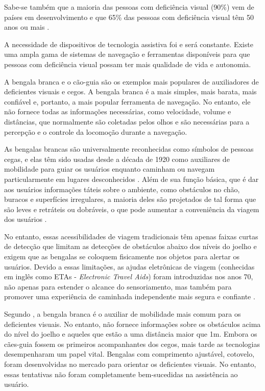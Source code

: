 Sabe-se também que a maioria das pessoas com deficiência visual (90\%) vem de países em desenvolvimento e que 65\% das pessoas com deficiência visual têm 50 anos ou mais \cite{Contreras2017}. 

A necessidade de dispositivos de tecnologia assistiva foi e será constante. Existe uma ampla gama de sistemas de navegação e ferramentas disponíveis para que pessoas com deficiência visual possam ter mais qualidade de vida e autonomia.

A bengala branca e o cão-guia são os exemplos mais populares de auxiliadores de deficientes visuais e cegos. A bengala branca é a mais simples, mais barata, mais confiável e, portanto, a mais popular ferramenta de navegação. No entanto, ele não fornece todas as informações necessárias, como velocidade, volume e distâncias, que normalmente são coletadas pelos olhos e são necessárias para a percepção e o controle da locomoção durante a navegação.

As bengalas brancas são universalmente reconhecidas como símbolos de pessoas cegas, e elas têm sido usadas desde a década de 1920 como auxiliares de mobilidade para guiar os usuários enquanto caminham ou navegam particularmente em lugares desconhecidos \cite{NAP1011}.
Além de sua função básica, que é dar aos usuários informações táteis sobre o ambiente, como obstáculos no chão, buracos e superfícies irregulares, a maioria deles são projetados de tal forma que são leves e retráteis ou dobráveis, o que pode aumentar a conveniência da viagem dos usuários \cite{Ahmad2018}.

No entanto, essas acessibilidades de viagem tradicionais têm apenas faixas curtas de detecção que limitam as detecções de obstáculos abaixo dos níveis do joelho e exigem que as bengalas se coloquem fisicamente nos objetos para alertar os usuários. Devido a essas limitações, as ajudas eletrônicas de viagem (conhecidas em inglês como ETAs - \textit{Electronic Travel Aids}) foram introduzidas nos anos 70, não apenas para estender o alcance do sensoriamento, mas também para promover uma experiência de caminhada independente mais segura e confiante \cite{Dakopoulos2010}.

Segundo , a bengala branca é o auxiliar de mobilidade mais comum para os deficientes visuais. No entanto, não fornece informações sobre os obstáculos acima do nível do joelho e aqueles que estão a uma distância maior que 1m. Embora os cães-guia fossem os primeiros acompanhantes dos cegos, mais tarde as tecnologias desempenharam um papel vital. Bengalas com comprimento ajustável, cotovelo, foram desenvolvidas no mercado para orientar os deficientes visuais. No entanto, essas tentativas não foram completamente bem-sucedidas na assistência ao usuário.

